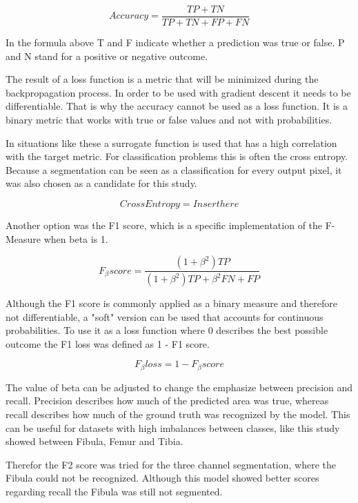 \begin{equation}
Accuracy = \frac{TP+TN}{TP+TN+FP+FN}
\end{equation}

In the formula above T and F indicate whether a prediction was true or false. P and N stand for a positive or negative outcome.

The result of a loss function is a metric that will be minimized during the backpropagation process. In order to be used with gradient descent it needs to be differentiable. That is why the accuracy cannot be used as a loss function. It is a binary metric that works with true or false values and not with probabilities.

In situations like these a surrogate function is used that has a high correlation with the target metric. For classification problems this is often the cross entropy. Because a segmentation can be seen as a classification for every output pixel, it was also chosen as a candidate for this study.

\begin{equation}
Cross Entropy = Insert here
\end{equation}

Another option was the F1 score, which is a specific implementation of the F-Measure when beta is 1. 

\begin{equation}
F_\beta score= \frac{(1 + \beta^2) TP}{(1+\beta^2)TP+\beta^2FN+FP}
\end{equation}

Although the F1 score is commonly applied as a binary measure and therefore not differentiable, a "soft" version can be used that accounts for continuous probabilities. To use it as a loss function where 0 describes the best possible outcome the F1 loss was defined as 1 - F1 score.

\begin{equation}
F_\beta loss = 1 - F_\beta score
\end{equation}

The value of beta can be adjusted to change the emphasize between precision and recall. Precision describes how much of the predicted area was true, whereas recall describes how much of the ground truth was recognized by the model. This can be useful for datasets with high imbalances between classes, like this study showed between Fibula, Femur and Tibia. 

Therefor the F2 score was tried for the three channel segmentation, where the Fibula could not be recognized. Although this model showed better scores regarding recall the Fibula was still not segmented.

